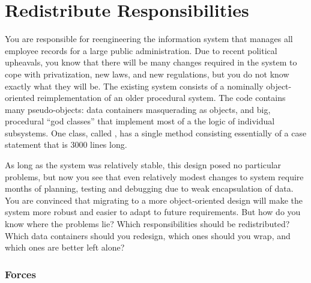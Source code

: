 \documentclass[a4paper,10pt,twoside]{book}
\begin{document}
	\renewcommand{\nnbb}[2]{} %
	\sloppy
\fi
\chapter{Redistribute Responsibilities}

You are responsible for reengineering the information system that manages all employee records for a large public administration. Due to recent political upheavals, you know that there will be many changes required in the system to cope with privatization, new laws, and new regulations, but you do not know exactly what they will be. The existing system consists of a nominally object-oriented reimplementation of an older procedural system. The code contains many pseudo-objects: data containers masquerading as objects, and big, procedural ``god classes'' that implement most of a the logic of individual subsystems. One class, called , has a single method consisting essentially of a case statement that is 3000 lines long.

As long as the system was relatively stable, this design posed no particular problems, but now you see that even relatively modest changes to system require months of planning, testing and debugging due to weak encapsulation of data. You are convinced that migrating to a more object-oriented design will make the system more robust and easier to adapt to future requirements. But how do you know where the problems lie? Which responsibilities should be redistributed? Which data containers should you redesign, which ones should you wrap, and which ones are better left alone?

\subsection*{Forces}
\end{document}
